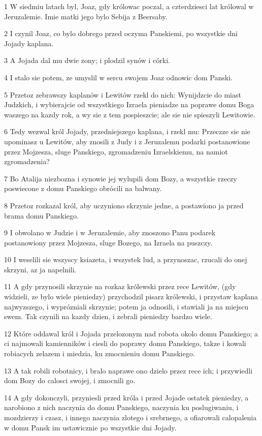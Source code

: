 \par 1 W siedmiu latach byl, Joaz, gdy królowac poczal, a czterdziesci lat królowal w Jeruzalemie. Imie matki jego bylo Sebija z Beersaby.
\par 2 I czynil Joaz, co bylo dobrego przed oczyma Panskiemi, po wszystkie dni Jojady kaplana.
\par 3 A Jojada dal mu dwie zony; i plodzil synów i córki.
\par 4 I stalo sie potem, ze umyslil w sercu swojem Joaz odnowic dom Panski.
\par 5 Przetoz zebrawszy kaplanów i Lewitów rzekl do nich: Wynijdzcie do miast Judzkich, i wybierajcie od wszystkiego Izraela pieniadze na poprawe domu Boga waszego na kazdy rok, a wy sie z tem pospieszcie; ale sie nie spieszyli Lewitowie.
\par 6 Tedy wezwal król Jojady, przedniejszego kaplana, i rzekl mu: Przeczze sie nie upominasz u Lewitów, aby znosili z Judy i z Jeruzalemu podarki postanowione przez Mojzesza, sluge Panskiego, zgromadzeniu Izraelskiemu, na namiot zgromadzenia?
\par 7 Bo Atalija niezbozna i synowie jej wylupili dom Bozy, a wszystkie rzeczy poswiecone z domu Panskiego obrócili na balwany.
\par 8 Przetoz rozkazal król, aby uczyniono skrzynie jedne, a postawiono ja przed brama domu Panskiego.
\par 9 I obwolano w Judzie i w Jeruzalemie, aby znoszono Panu podarek postanowiony przez Mojzesza, sluge Bozego, na Izraela na puszczy.
\par 10 I weselili sie wszyscy ksiazeta, i wszystek lud, a przynoszac, rzucali do onej skrzyni, az ja napelnili.
\par 11 A gdy przynosili skrzynie na rozkaz królewski przez rece Lewitów, (gdy widzieli, ze bylo wiele pieniedzy) przychodzil pisarz królewski, i przystaw kaplana najwyzszego, i wyprózniali skrzynie; potem ja odnosili, i stawiali ja na miejscu swem. Tak czynili na kazdy dzien, i zebrali pieniedzy bardzo wiele.
\par 12 Które oddawal król i Jojada przelozonym nad robota okolo domu Panskiego; a ci najmowali kamienników i ciesli do poprawy domu Panskiego, takze i kowali robiacych zelazem i miedzia, ku zmocnieniu domu Panskiego.
\par 13 A tak robili robotnicy, i bralo naprawe ono dzielo przez rece ich; i przywiedli dom Bozy do calosci swojej, i zmocnili go.
\par 14 A gdy dokonczyli, przyniesli przed króla i przed Jojade ostatek pieniedzy, a narobiono z nich naczynia do domu Panskiego, naczynia ku poslugiwaniu, i mozdzierzy i czasz, i innego naczynia zlotego i srebrnego, a ofiarowali calopalenia w domu Pansk im ustawicznie po wszystkie dni Jojady.
